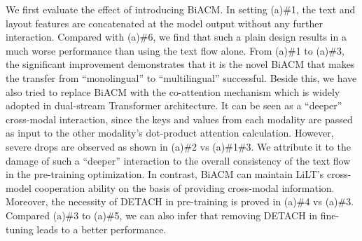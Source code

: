 \documentclass[11pt]{article}
\begin{document}
We first evaluate the effect of introducing BiACM. In setting (a)\#1, the text and layout features are concatenated at the model output without any further interaction.
Compared with (a)\#6, we find that such a plain design results in a much worse performance than using the text flow alone. 
From  (a)\#1 to  (a)\#3, the significant improvement demonstrates that 
it is the novel BiACM that makes the transfer from ``monolingual” to ``multilingual” successful. Beside this, we have also tried to replace BiACM with the co-attention mechanism \cite{lu2019vilbert} which is widely adopted in  dual-stream Transformer architecture. It can be seen as a  ``deeper” cross-modal interaction, since  the keys and values from each modality are passed as input to the other modality’s dot-product attention calculation. However, severe drops are observed as shown in (a)\#2 vs (a)\#1\#3. We attribute it to  the damage of such a ``deeper”  interaction to the overall consistency of the text flow in the pre-training optimization. In contrast, BiACM can maintain LiLT's cross-model cooperation ability on the basis of providing cross-modal information.
Moreover, the necessity of DETACH in pre-training is  proved  in (a)\#4 vs (a)\#3.
Compared (a)\#3 to (a)\#5, we can also infer that removing DETACH in fine-tuning leads to a better performance.


\begin{table}[!]
\centering
{}
\caption{Comparison on the semantic entity recognition (SER)  task of CORD \cite{park2019cord} dataset. $^1$\cite{garncarek2020lambert};$^2$\cite{2021going}.}
\label{tab:cord}
\end{table}
\end{document}
